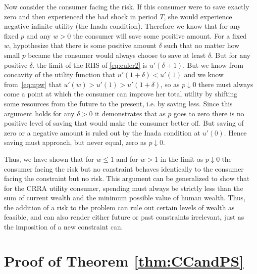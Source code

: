 \documentclass[titlepage]{\econtex}
\begin{document}
Now consider the consumer facing the risk. If this consumer were to
save exactly zero and then experienced the bad shock in period $T$,
she would experience negative infinite utility (the Inada condition).
Therefore we know that for any fixed $p$ and any $w>0$ the consumer
will save some positive amount.  For a fixed $w$, hypothesize that
there is some positive amount $\delta$ such that no matter how small
$p$ became the consumer would always choose to save at least $\delta$.
But for any positive $\delta$, the limit of the RHS of
\eqref{eq:euler2} is $u'(\delta+1)$.  But we know from concavity of
the utility function that $u'(1+\delta) < u'(1)$ and we know
from~\eqref{eq:upw} that $u'(w) > u'(1) > u'(1+\delta)$, so as $p
\downarrow 0$ there must always come a point at which the consumer can
improve her total utility by shifting some resources from the future
to the present, i.e. by saving less.  Since this argument holds for
any $\delta>0$ it demonstrates that as $p$ goes to zero there is no
positive level of saving that would make the consumer better off.  But
saving of zero or a negative amount is ruled out by the Inada
condition at $u'(0)$.  Hence saving must approach, but never equal, zero
as $p \downarrow 0$.

Thus, we have shown that for $w \leq 1 $ and for $w > 1$ in the limit
as $p \downarrow 0$ the consumer facing the risk but no constraint
behaves identically to the consumer facing the constraint but no risk.
This argument can be generalized to show that for the CRRA utility
consumer, spending must always be strictly less than the sum of
current wealth and the minimum possible value of human wealth.  Thus,
the addition of a risk to the problem can rule out certain levels of
wealth as feasible, and can also render either future or past
constraints irrelevant, just as the imposition of a new constraint
can. 


\section{Proof of Theorem \ref{thm:CCandPS}}\label{app:CCandPS}
\end{document}
